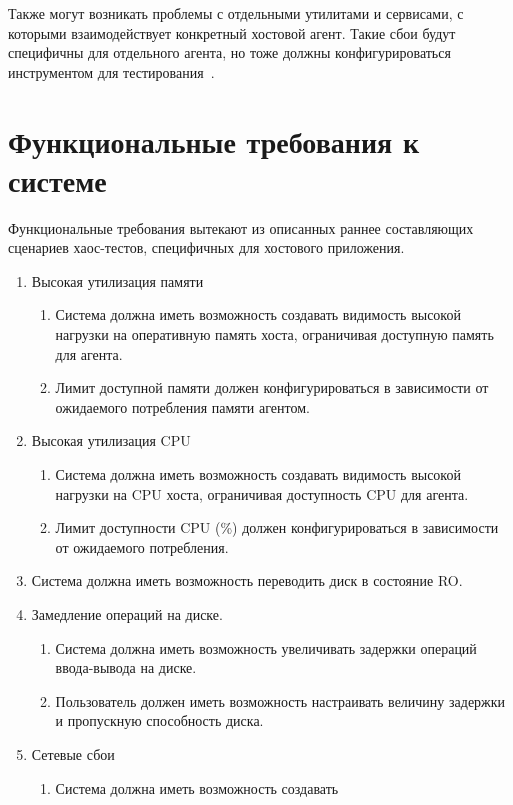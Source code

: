 Также могут возникать проблемы с отдельными утилитами и сервисами, с которыми взаимодействует конкретный хостовой агент.
Такие сбои будут специфичны для отдельного агента, но тоже должны конфигурироваться инструментом для тестирования~\cite{Simonsson2021}.

\section{Функциональные требования к системе}

Функциональные требования вытекают из описанных раннее составляющих сценариев хаос-тестов, специфичных для
хостового приложения.

\begin{enumerate}
  \item Высокая утилизация памяти
  \begin{enumerate}
    \item Система должна иметь возможность создавать видимость высокой нагрузки на оперативную память хоста,
    ограничивая доступную память для агента.
    \item Лимит доступной памяти должен конфигурироваться в зависимости от ожидаемого потребления памяти агентом.
  \end{enumerate}
  \item Высокая утилизация CPU
  \begin{enumerate}
    \item Система должна иметь возможность создавать видимость высокой нагрузки на CPU хоста,
    ограничивая доступность CPU для агента.
    \item Лимит доступности CPU (\%) должен конфигурироваться в зависимости от ожидаемого потребления.
  \end{enumerate}
  \item Система должна иметь возможность переводить диск в состояние RO.
  \item Замедление операций на диске.
  \begin{enumerate}
    \item Система должна иметь возможность увеличивать задержки операций ввода-вывода на диске.
    \item Пользователь должен иметь возможность настраивать величину задержки и пропускную способность диска.
  \end{enumerate}
  \item Сетевые сбои
  \begin{enumerate}
    \item Система должна иметь возможность создавать

\end{enumerate}
\end{enumerate}
